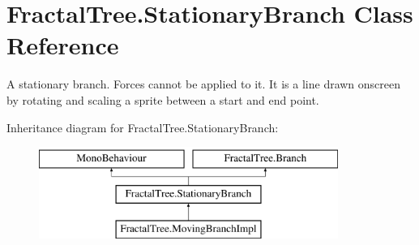 \hypertarget{class_fractal_tree_1_1_stationary_branch}{}\section{Fractal\+Tree.\+Stationary\+Branch Class Reference}
\label{class_fractal_tree_1_1_stationary_branch}


A stationary branch. Forces cannot be applied to it. It is a line drawn onscreen by rotating and scaling a sprite between a start and end point.  


Inheritance diagram for Fractal\+Tree.\+Stationary\+Branch\+:\begin{figure}[H]
\begin{center}
\leavevmode
\includegraphics[height=3.000000cm]{class_fractal_tree_1_1_stationary_branch}
\end{center}
\end{figure}
